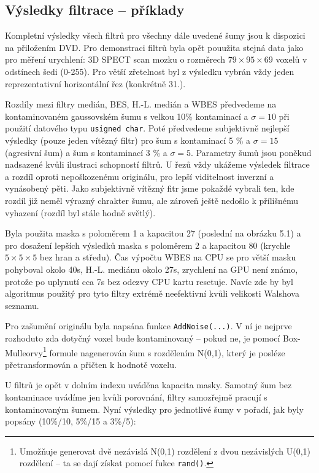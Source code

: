      \subsection{Výsledky filtrace -- příklady}
     
     Kompletní výsledky všech filtrů pro všechny dále uvedené šumy jsou k dispozici na přiložením DVD. Pro demonstraci filtrů byla opět pouužita stejná data jako pro měření urychlení: 3D SPECT scan mozku o rozměrech $79 \times 95 \times 69$ voxelů v odstínech šedi (0-255). Pro větší zřetelnost byl z výsledku vybrán vždy jeden reprezentativní horizontální řez (konkrétně 31.).
     
     \vspace{0.5cm}
     
     Rozdíly mezi filtry medián, BES, H.-L. medián a WBES předvedeme na kontaminovaném gaussovském šumu s velkou 10\% kontaminací a $\sigma = 10$ při použití datového typu {\tt usigned char}. Poté předvedeme subjektivně nejlepší výsledky (pouze jeden vítězný filtr) pro šum s kontaminací 5 \% a $\sigma = 15$ (agresivní šum) a šum s kontaminací 3 \% a $\sigma = 5$. Parametry šumů jsou poněkud nadsazené kvůli ilustraci schopností filtrů. U řezů vždy ukážeme výsledek filtrace a rozdíl oproti nepoškozenému originálu, pro lepší viditelnost inverzní a vynásobený pěti. Jako subjektivně vítězný fitr jsme pokaždé vybrali ten, kde rozdíl již neměl výrazný chrakter šumu, ale zároveň ještě nedošlo k přílišnému vyhazení (rozdíl byl stále hodně světlý).

    Byla použita maska s poloměrem 1 a kapacitou 27 (poslední na obrázku 5.1) a pro dosažení lepších výsledků maska s poloměrem 2 a kapacitou 80 (krychle $5\times 5\times 5$ bez hran a středu). Čas výpočtu WBES na CPU se pro větší masku pohyboval okolo 40s, H.-L. mediánu okolo 27s, zrychlení na GPU není známo, protože po uplynutí cca 7s bez odezvy CPU kartu resetuje. Navíc zde by byl algoritmus použitý pro tyto filtry extrémě neefektivní kvůli velikosti Walshova seznamu.

    Pro zašumění originálu byla napsána funkce {\tt AddNoise(...)}. V ní je nejprve rozhoduto zda dotyčný voxel bude kontaminovaný -- pokud ne, je pomocí Box-Mulleorvy\footnote{Umožňuje generovat dvě nezávislá N(0,1) rozdělení z dvou nezávislých U(0,1) rozdělení -- ta se dají získat pomocí fukce {\tt rand()}.} formule nagenerován šum s rozdělením N(0,1), který je posléze přetransformován a přičten k hodnotě voxelu.

    U filtrů je opět v dolním indexu uváděna kapacita masky. Samotný šum bez kontaminace uvádíme jen kvůli porovnání, filtry samozřejmě pracují s kontaminovaným šumem. Nyní výsledky pro jednotlivé šumy v pořadí, jak byly popsány (10\%/10, 5\%/15 a 3\%/5):

